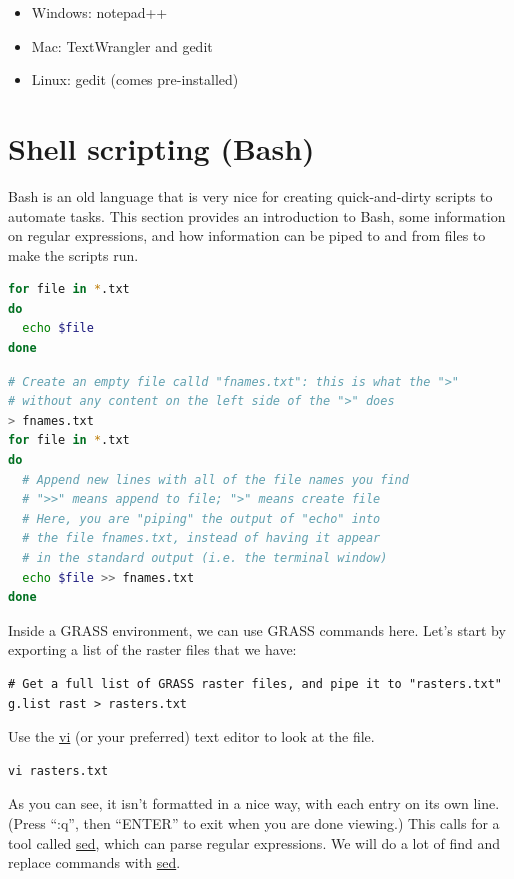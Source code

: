 \documentclass{book}
\begin{document}
\begin{itemize}
	\item Windows: notepad++
	\item Mac: TextWrangler and gedit
	\item Linux: gedit (comes pre-installed)
\end{itemize}

\section{Shell scripting (Bash) \label{s:BashScripting}}

Bash is an old language that is very nice for creating quick-and-dirty scripts to automate tasks. This section provides an introduction to Bash, some information on regular expressions, and how information can be piped to and from files to make the scripts run.

\begin{lstlisting}[language=Bash]
for file in *.txt
do
  echo $file
done
\end{lstlisting}

\begin{lstlisting}[language=Bash]
# Create an empty file calld "fnames.txt": this is what the ">" 
# without any content on the left side of the ">" does
> fnames.txt
for file in *.txt
do
  # Append new lines with all of the file names you find
  # ">>" means append to file; ">" means create file
  # Here, you are "piping" the output of "echo" into 
  # the file fnames.txt, instead of having it appear 
  # in the standard output (i.e. the terminal window)
  echo $file >> fnames.txt
done
\end{lstlisting}

Inside a GRASS environment, we can use GRASS commands here. Let's start by exporting a list of the raster files that we have:
\begin{lstlisting}
# Get a full list of GRASS raster files, and pipe it to "rasters.txt"
g.list rast > rasters.txt
\end{lstlisting}

Use the \url{vi} (or your preferred) text editor to look at the file.
\begin{lstlisting}
vi rasters.txt
\end{lstlisting}
As you can see, it isn't formatted in a nice way, with each entry on its own line. (Press ``:q'', then ``ENTER'' to exit when you are done viewing.) This calls for a tool called \url{sed}, which can parse regular expressions. We will do a lot of find and replace commands with \url{sed}.
\end{document}
